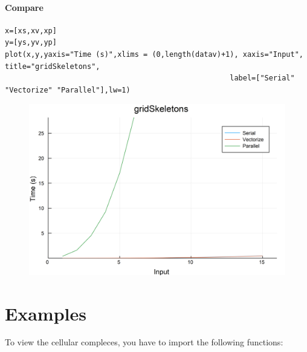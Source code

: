 \documentclass{article}
\begin{document}
\paragraph{Compare}
\begin{flushleft}\small
\begin{list}{}{} \item
    \begin{Verbatim}[tabsize=4]
x=[xs,xv,xp]
y=[ys,yv,yp]
plot(x,y,yaxis="Time (s)",xlims = (0,length(datav)+1), xaxis="Input", title="gridSkeletons",
                                                    label=["Serial" "Vectorize" "Parallel"],lw=1)
    \end{Verbatim}
\end{list}
\end{flushleft}   

\begin{figure}[h!]
\centering
\includegraphics[scale=0.06]{gridSkeletonsCom.png}
\end{figure}
\section{Examples}







To view the cellular compleces, you have to import the following functions:
\end{document}
